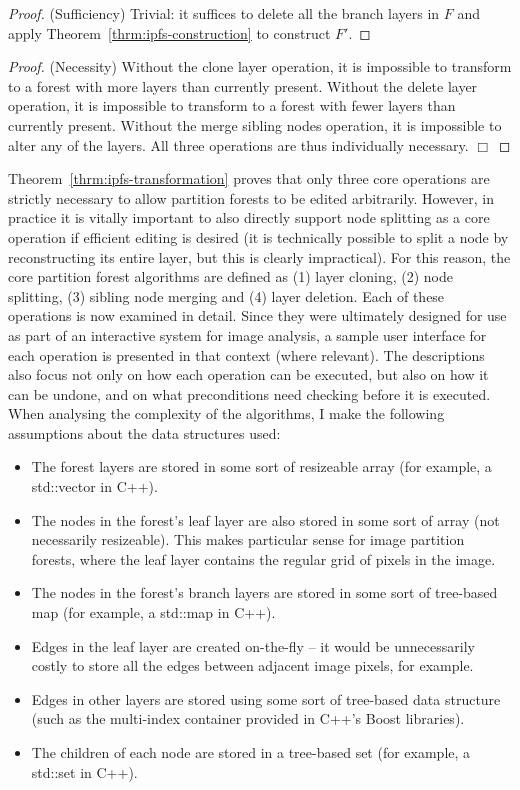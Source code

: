 \begin{proof}
(Sufficiency) Trivial: it suffices to delete all the branch layers in $F$ and apply Theorem~\ref{thrm:ipfs-construction} to construct $F'$.
\end{proof}

\begin{proof}
(Necessity) Without the clone layer operation, it is impossible to transform to a forest with more layers than currently present. Without the delete layer operation, it is impossible to transform to a forest with fewer layers than currently present. Without the merge sibling nodes operation, it is impossible to alter any of the layers. All three operations are thus individually necessary. $\Box$
\end{proof}

\noindent Theorem~\ref{thrm:ipfs-transformation} proves that only three core operations are strictly necessary to allow partition forests to be edited arbitrarily. However, in practice it is vitally important to also directly support node splitting as a core operation if efficient editing is desired (it is technically possible to split a node by reconstructing its entire layer, but this is clearly impractical). For this reason, the core partition forest algorithms are defined as (1) layer cloning, (2) node splitting, (3) sibling node merging and (4) layer deletion. Each of these operations is now examined in detail. Since they were ultimately designed for use as part of an interactive system for image analysis, a sample user interface for each operation is presented in that context (where relevant). The descriptions also focus not only on how each operation can be executed, but also on how it can be undone, and on what preconditions need checking before it is executed. When analysing the complexity of the algorithms, I make the following assumptions about the data structures used:

\begin{itemize}
\item The forest layers are stored in some sort of resizeable array (for example, a std::vector in C++).
\item The nodes in the forest's leaf layer are also stored in some sort of array (not necessarily resizeable). This makes particular sense for image partition forests, where the leaf layer contains the regular grid of pixels in the image.
\item The nodes in the forest's branch layers are stored in some sort of tree-based map (for example, a std::map in C++).
\item Edges in the leaf layer are created on-the-fly -- it would be unnecessarily costly to store all the edges between adjacent image pixels, for example.
\item Edges in other layers are stored using some sort of tree-based data structure (such as the multi-index container provided in C++'s Boost libraries).
\item The children of each node are stored in a tree-based set (for example, a std::set in C++).
\end{itemize}

